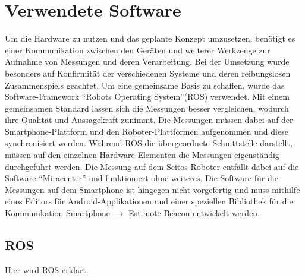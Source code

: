 \section{Verwendete Software}
Um die Hardware zu nutzen und das geplante Konzept umzusetzen, benötigt es einer Kommunikation zwischen den Geräten und weiterer Werkzeuge zur Aufnahme von Messungen und deren Verarbeitung. Bei der Umsetzung wurde besonders auf Konfirmität der verschiedenen Systeme und deren reibungslosen Zusammenspiels geachtet. Um eine gemeinsame Basis zu schaffen, wurde das Software-Framework "`Robots Operating System"'(ROS) verwendet. Mit einem gemeinsamen Standard lassen sich die Messungen besser vergleichen, wodurch ihre Qualität und Aussagekraft zunimmt. Die Messungen müssen dabei auf der Smartphone-Plattform und den Roboter-Plattformen aufgenommen und  diese synchronisiert werden. Während ROS die übergeordnete Schnittstelle darstellt, müssen auf den einzelnen Hardware-Elementen die Messungen eigenständig durchgeführt werden. Die Messung auf dem Scitos-Roboter entfällt dabei auf die Software "`Miracenter"' und funktioniert ohne weiteres. Die Software für die Messungen auf dem Smartphone ist hingegen nicht vorgefertig und muss mithilfe eines Editors für Android-Applikationen und einer speziellen Bibliothek für die Kommunikation Smartphone $\rightarrow$ Estimote Beacon entwickelt werden.
\subsection{ROS}
Hier wird ROS erklärt.

